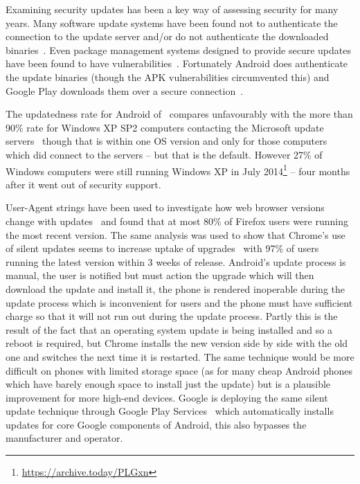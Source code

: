 \documentclass[conference,a4paper,twoside]{IEEEtran}
\let\OldTodo\todo
\renewcommand{\todo}{\OldTodo[inline]}
\newcommand{\todolater}[1]{}%
\begin{document}
Examining security updates has been a key way of assessing security for many years.
Many software update systems have been found not to authenticate the connection to the update server and/or do not authenticate the downloaded binaries~\cite{Bellissimo2006}.
Even package management systems designed to provide secure updates have been found to have vulnerabilities~\cite{Cappos2008}.
Fortunately Android does authenticate the update binaries (though the APK vulnerabilities circumvented this) and Google Play downloads them over a secure connection~\cite{Viennot2014}. \todolater{double check that}

The updatedness rate for Android of \daUpdatednessPerc\ compares unfavourably with the more than 90\% rate for Windows XP SP2 computers contacting the Microsoft update servers~\cite{Gkantsidis2006} though that is within one OS version and only for those computers which did connect to the servers -- but that is the default.
However 27\% of Windows computers were still running Windows XP in July 2014\footnote{\url{https://archive.today/PLGxn}\todolater{Get updated figures before publication}} -- four months after it went out of security support.

User-Agent strings have been used to investigate how web browser versions change with updates~\cite{Frei2008} and found that at most 80\% of Firefox users were running the most recent version.
The same analysis was used to show that Chrome's use of silent updates seems to increase uptake of upgrades~\cite{Duebendorfer2010} with 97\% of users running the latest version within 3 weeks of release.
Android's update process is manual, the user is notified but must action the upgrade which will then download the update and install it, the phone is rendered inoperable during the update process which is inconvenient for users and the phone must have sufficient charge so that it will not run out during the update process.
Partly this is the result of the fact that an operating system update is being installed and so a reboot is required, but Chrome installs the new version side by side with the old one and switches the next time it is restarted.
The same technique would be more difficult on phones with limited storage space (as for many cheap Android phones which have barely enough space to install just the update) but is a plausible improvement for more high-end devices.
Google is deploying the same silent update technique through Google Play Services~\cite{TODO} which automatically installs updates for core Google components of Android, this also bypasses the manufacturer and operator.
\end{document}

